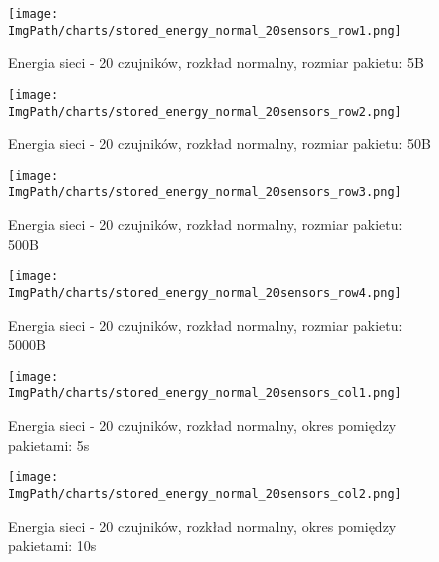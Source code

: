 \begin{figure}[!htbp]
	\begin{center}
		\texttt{[image: \\ImgPath/charts/stored\_energy\_normal\_20sensors\_row1.png]}
	\end{center}
	\caption{Energia sieci - 20 czujników, rozkład normalny, rozmiar pakietu: 5B}
\end{figure}

\begin{figure}[!htbp]
	\begin{center}
		\texttt{[image: \\ImgPath/charts/stored\_energy\_normal\_20sensors\_row2.png]}
	\end{center}
	\caption{Energia sieci - 20 czujników, rozkład normalny, rozmiar pakietu: 50B}
\end{figure}

\begin{figure}[!htbp]
	\begin{center}
		\texttt{[image: \\ImgPath/charts/stored\_energy\_normal\_20sensors\_row3.png]}
	\end{center}
	\caption{Energia sieci - 20 czujników, rozkład normalny, rozmiar pakietu: 500B}
\end{figure}

\begin{figure}[!htbp]
	\begin{center}
		\texttt{[image: \\ImgPath/charts/stored\_energy\_normal\_20sensors\_row4.png]}
	\end{center}
	\caption{Energia sieci - 20 czujników, rozkład normalny, rozmiar pakietu: 5000B}
\end{figure}

\begin{figure}[!htbp]
	\begin{center}
		\texttt{[image: \\ImgPath/charts/stored\_energy\_normal\_20sensors\_col1.png]}
	\end{center}
	\caption{Energia sieci - 20 czujników, rozkład normalny, okres pomiędzy pakietami: 5s}
\end{figure}

\begin{figure}[!htbp]
	\begin{center}
		\texttt{[image: \\ImgPath/charts/stored\_energy\_normal\_20sensors\_col2.png]}
	\end{center}
	\caption{Energia sieci - 20 czujników, rozkład normalny, okres pomiędzy pakietami: 10s}
\end{figure}

